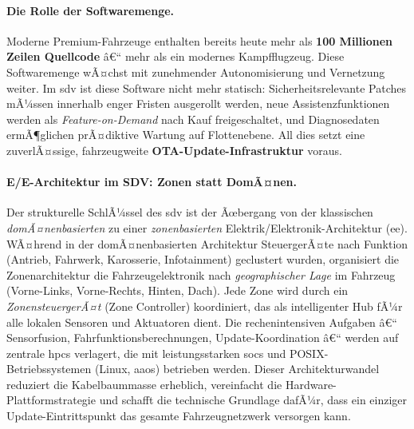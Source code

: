 ﻿\documentclass[12pt,a4paper,twoside]{article}
\begin{document}
\paragraph{Die Rolle der Softwaremenge.}
Moderne Premium-Fahrzeuge enthalten bereits heute mehr als
\textbf{100 Millionen Zeilen Quellcode} â€“ mehr als ein modernes
Kampfflugzeug. Diese Softwaremenge wÃ¤chst mit zunehmender Autonomisierung
und Vernetzung weiter. Im \gls{sdv} ist diese Software nicht mehr statisch:
Sicherheitsrelevante Patches mÃ¼ssen innerhalb enger Fristen ausgerollt
werden, neue Assistenzfunktionen werden als \textit{Feature-on-Demand}
nach Kauf freigeschaltet, und Diagnosedaten ermÃ¶glichen prÃ¤diktive
Wartung auf Flottenebene. All dies setzt eine zuverlÃ¤ssige,
fahrzeugweite \textbf{OTA-Update-Infrastruktur} voraus.

\paragraph{E/E-Architektur im SDV: Zonen statt DomÃ¤nen.}
Der strukturelle SchlÃ¼ssel des \gls{sdv} ist der Ãœbergang von der
klassischen \emph{domÃ¤nenbasierten} zu einer \emph{zonenbasierten}
Elektrik/Elektronik-Architektur (\gls{ee}). WÃ¤hrend in der domÃ¤nenbasierten
Architektur SteuergerÃ¤te nach Funktion (Antrieb, Fahrwerk, Karosserie,
Infotainment) geclustert wurden, organisiert die Zonenarchitektur die
Fahrzeugelektronik nach \emph{geographischer Lage} im Fahrzeug
(Vorne-Links, Vorne-Rechts, Hinten, Dach). Jede Zone wird durch ein
\emph{ZonensteuergerÃ¤t} (Zone Controller) koordiniert, das als
intelligenter Hub fÃ¼r alle lokalen Sensoren und Aktuatoren dient.
Die rechenintensiven Aufgaben â€“ Sensorfusion, Fahrfunktionsberechnungen,
Update-Koordination â€“ werden auf zentrale \glspl{hpc} verlagert, die
mit leistungsstarken \glspl{soc} und POSIX-Betriebssystemen
(Linux, \gls{aaos}) betrieben werden. Dieser Architekturwandel
reduziert die Kabelbaummasse erheblich, vereinfacht die
Hardware-Plattformstrategie und schafft die technische Grundlage
dafÃ¼r, dass ein einziger Update-Eintrittspunkt das gesamte
Fahrzeugnetzwerk versorgen kann.
\end{document}
